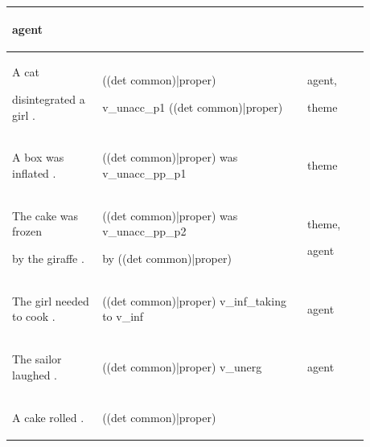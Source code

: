 \documentclass[11pt]{article}
\begin{document}
\begin{table}
\begin{tabular}{p{0.225\linewidth} p{0.50\linewidth} p{0.15\linewidth}}
\begin{tiny}
agent\end{tiny} \\
\hline
\begin{tiny}A cat 

disintegrated a girl .\end{tiny} & \begin{tiny}((det common)|proper)

v\_unacc\_p1 ((det common)|proper)\end{tiny} & \begin{tiny}agent,

theme\end{tiny} \\
\hline
\begin{tiny}A box was inflated .\end{tiny} & \begin{tiny}((det common)|proper) was v\_unacc\_pp\_p1\end{tiny} & \begin{tiny}theme\end{tiny} \\
\hline
\begin{tiny}The cake was frozen 

by the giraffe .\end{tiny} & \begin{tiny}((det common)|proper) was v\_unacc\_pp\_p2 

by ((det common)|proper)\end{tiny} & \begin{tiny}theme,

agent\end{tiny} \\
\hline
\begin{tiny}The girl needed to cook .\end{tiny} & \begin{tiny}((det common)|proper) v\_inf\_taking to v\_inf\end{tiny} & \begin{tiny}agent\end{tiny} \\
\hline
\begin{tiny}The sailor laughed .\end{tiny} & \begin{tiny}((det common)|proper) v\_unerg\end{tiny} & \begin{tiny}agent\end{tiny} \\
\hline
\begin{tiny}A cake rolled .\end{tiny} & \begin{tiny}((det common)|proper)


\end{tiny}
\end{tabular}
\end{table}
\end{document}
